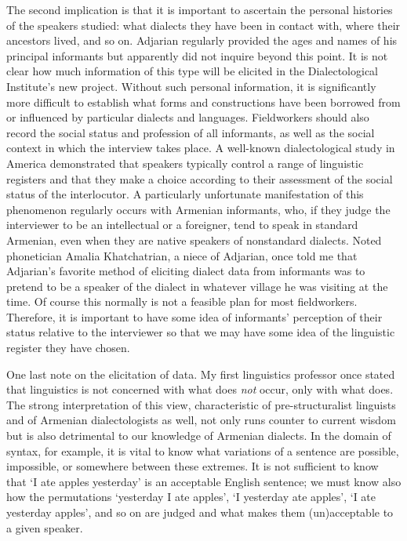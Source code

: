 \documentclass[output=paper]{langscibook}
\begin{document}
The second implication is that it is important to ascertain the personal histories of the speakers studied: what dialects they have been in contact with, where their ancestors lived, and so on. Adjarian regularly provided the ages and names of his principal informants but apparently did not inquire beyond this point. It is not clear how much information of this type will be elicited in the Dialectological Institute's new project. Without such personal information, it is significantly more difficult to establish what forms and constructions have been borrowed from or influenced by particular dialects and languages. Fieldworkers should also record the social status and profession of all informants, as well as the social context in which the interview takes place. A well-known dialectological study in America \citep{Labov-1972-Sociolinguisticpatterns} demonstrated that speakers typically control a range of linguistic registers and that they make a choice according to their assessment of the social status of the interlocutor. A particularly unfortunate manifestation of this phenomenon regularly occurs with Armenian informants, who, if they judge the interviewer to be an intellectual or a foreigner, tend to speak in standard Armenian, even when they are native speakers of nonstandard dialects. Noted phonetician Amalia Khatchatrian, a niece of Adjarian, once told me that Adjarian's favorite method of eliciting dialect data from informants was to pretend to be a speaker of the dialect in whatever village he was visiting at the time. Of course this normally is not a feasible plan for most fieldworkers. Therefore, it is important to have some idea of informants' perception of their status relative to the interviewer so that we may have some idea of the linguistic register they have chosen.

One last note on the elicitation of data. My first linguistics professor once stated that linguistics is not concerned with what does \textit{not} occur, only with what does. The strong interpretation of this view, characteristic of pre-structuralist linguists and of Armenian dialectologists as well, not only runs counter to current wisdom but is also detrimental to our knowledge of Armenian dialects. In the domain of syntax, for example, it is vital to know what variations of a sentence are possible, impossible, or somewhere between these extremes. It is not sufficient to know that `I ate apples yesterday' is an acceptable English sentence; we must know also how the permutations `yesterday I ate apples', `I yesterday ate apples', `I ate yesterday apples', and so on are judged and what makes them (un)acceptable to a given speaker.
\end{document}
